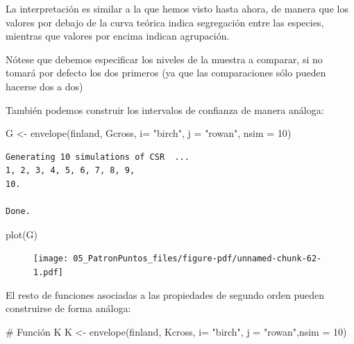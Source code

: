 \documentclass[
  letterpaper,
  DIV=11,
  numbers=noendperiod]{scrreprt}
\newenvironment{Shaded}{\begin{snugshade}}{\end{snugshade}}
\newcommand{\AttributeTok}[1]{\textcolor[rgb]{0.40,0.45,0.13}{#1}}
\newcommand{\CommentTok}[1]{\textcolor[rgb]{0.37,0.37,0.37}{#1}}
\newcommand{\DecValTok}[1]{\textcolor[rgb]{0.68,0.00,0.00}{#1}}
\newcommand{\FunctionTok}[1]{\textcolor[rgb]{0.28,0.35,0.67}{#1}}
\newcommand{\NormalTok}[1]{\textcolor[rgb]{0.00,0.23,0.31}{#1}}
\newcommand{\OtherTok}[1]{\textcolor[rgb]{0.00,0.23,0.31}{#1}}
\newcommand{\StringTok}[1]{\textcolor[rgb]{0.13,0.47,0.30}{#1}}
\begin{document}
La interpretación es similar a la que hemos visto hasta ahora, de manera
que los valores por debajo de la curva teórica indica segregación entre
las especies, mientras que valores por encima indican agrupación.

Nótese que debemos especificar los niveles de la muestra a comparar, si
no tomará por defecto los dos primeros (ya que las comparaciones sólo
pueden hacerse dos a dos)

También podemos construir los intervalos de confianza de manera análoga:

\begin{Shaded}
\begin{Highlighting}[]
\NormalTok{ G }\OtherTok{\textless{}{-}} \FunctionTok{envelope}\NormalTok{(finland, Gcross, }\AttributeTok{i=} \StringTok{"birch"}\NormalTok{, }\AttributeTok{j =} \StringTok{"rowan"}\NormalTok{,}
               \AttributeTok{nsim =} \DecValTok{10}\NormalTok{)}
\end{Highlighting}
\end{Shaded}

\begin{verbatim}
Generating 10 simulations of CSR  ...
1, 2, 3, 4, 5, 6, 7, 8, 9, 
10.

Done.
\end{verbatim}

\begin{Shaded}
\begin{Highlighting}[]
\FunctionTok{plot}\NormalTok{(G)}
\end{Highlighting}
\end{Shaded}

\begin{figure}[H]

{\centering \texttt{[image: 05\_PatronPuntos\_files/figure-pdf/unnamed-chunk-62-1.pdf]}

}

\end{figure}

El resto de funciones asociadas a las propiedades de segundo orden
pueden construirse de forma análoga:

\begin{Shaded}
\begin{Highlighting}[]
\CommentTok{\# Función K}
\NormalTok{ K }\OtherTok{\textless{}{-}} \FunctionTok{envelope}\NormalTok{(finland, Kcross, }\AttributeTok{i=} \StringTok{"birch"}\NormalTok{, }\AttributeTok{j =} \StringTok{"rowan"}\NormalTok{,}\AttributeTok{nsim =} \DecValTok{10}\NormalTok{)}
\end{Highlighting}
\end{Shaded}
\end{document}
